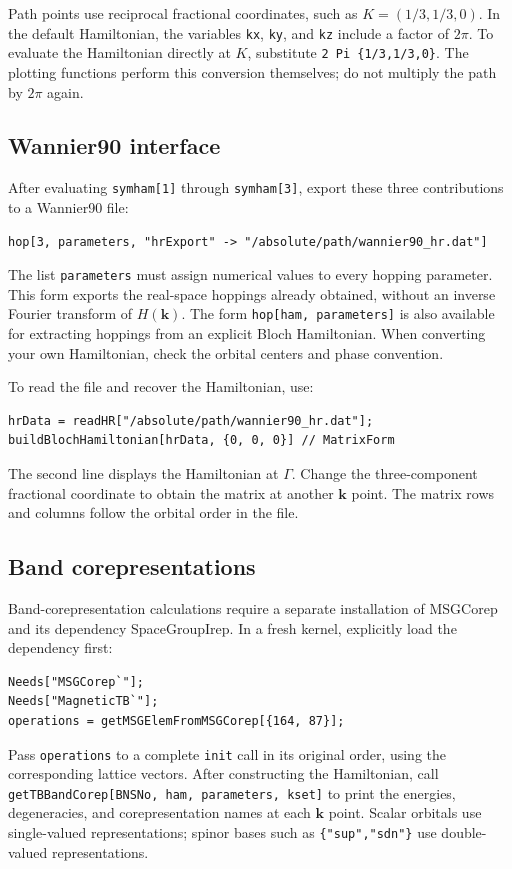 \documentclass[titlepage,a4paper,12pt]{article}
\begin{document}
Path points use reciprocal fractional coordinates, such as
$K=(1/3,1/3,0)$. In the default Hamiltonian, the variables \lstinline|kx|,
\lstinline|ky|, and \lstinline|kz| include a factor of $2\pi$.
To evaluate the Hamiltonian directly at $K$, substitute
\lstinline|2 Pi {1/3,1/3,0}|. The plotting functions perform this conversion
themselves; do not multiply the path by $2\pi$ again.

\subsection{Wannier90 interface}
After evaluating \lstinline|symham[1]| through \lstinline|symham[3]|, export
these three contributions to a Wannier90 file:
\begin{lstlisting}[numbers=none]
hop[3, parameters, "hrExport" -> "/absolute/path/wannier90_hr.dat"]
\end{lstlisting}
The list \lstinline|parameters| must assign numerical values to every hopping
parameter. This form exports the real-space hoppings already obtained, without
an inverse Fourier transform of $H(\boldsymbol k)$.
The form \lstinline|hop[ham, parameters]| is also available for extracting
hoppings from an explicit Bloch Hamiltonian. When converting your own
Hamiltonian, check the orbital centers and phase convention.

To read the file and recover the Hamiltonian, use:
\begin{lstlisting}
hrData = readHR["/absolute/path/wannier90_hr.dat"];
buildBlochHamiltonian[hrData, {0, 0, 0}] // MatrixForm
\end{lstlisting}
The second line displays the Hamiltonian at $\Gamma$. Change the three-component
fractional coordinate to obtain the matrix at another $\boldsymbol k$ point.
The matrix rows and columns follow the orbital order in the file.

\subsection{Band corepresentations}
Band-corepresentation calculations require a separate installation of
\textsf{MSGCorep} and its dependency \textsf{SpaceGroupIrep}.
In a fresh kernel, explicitly load the dependency first:
\begin{lstlisting}[numbers=none]
Needs["MSGCorep`"];
Needs["MagneticTB`"];
operations = getMSGElemFromMSGCorep[{164, 87}];
\end{lstlisting}
Pass \lstinline|operations| to a complete \lstinline|init| call in its original
order, using the corresponding lattice vectors. After constructing the
Hamiltonian, call
\lstinline|getTBBandCorep[BNSNo, ham, parameters, kset]|
to print the energies, degeneracies, and corepresentation names at each
$\boldsymbol k$ point. Scalar orbitals use single-valued representations;
spinor bases such as \lstinline|{"sup","sdn"}| use double-valued representations.
\end{document}
